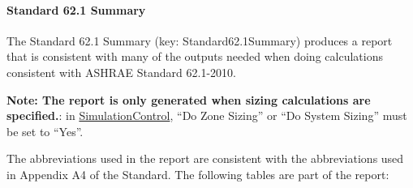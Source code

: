 \paragraph{Standard 62.1 Summary}\label{standard-62.1-summary}

The Standard 62.1 Summary (key: Standard62.1Summary) produces a report that is consistent with many of the outputs needed when doing calculations consistent with ASHRAE Standard 62.1-2010.

\textbf{Note: The report is only generated when sizing calculations are specified.}: in \hyperref[simulationcontrol]{SimulationControl}, ``Do Zone Sizing'' or ``Do System Sizing'' must be set to ``Yes''.

The abbreviations used in the report are consistent with the abbreviations used in Appendix A4 of the Standard. The following tables are part of the report:

